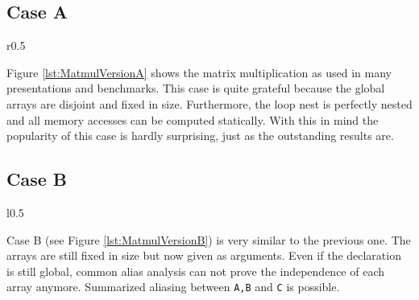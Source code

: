 

\clearpage
\lstset{frame=none}
\subsection*{Case A} 
\label{CaseStudyCaseA}
\begin{wrapfigure}[]{r}{0.5\textwidth}
  \centering
    \hfill
    \hfill
    \begin{minipage}[c]{0.4\textwidth}
    \vspace*{-7mm}
    
    \end{minipage}
    \hfill
    \hfill
    \vspace*{-2mm}
    \caption{Matrix multiplication case A}
   \label{lst:MatmulVersionA}
\end{wrapfigure}

Figure \ref{lst:MatmulVersionA} shows the matrix multiplication as used in 
many presentations and benchmarks. This case is quite grateful because the
global arrays are disjoint and fixed in size. Furthermore, the loop nest is
perfectly nested and all memory accesses can be computed statically.
With this in mind the popularity of this case is hardly surprising,
just as the outstanding results are.


\subsection*{Case B} 
\begin{wrapfigure}[]{l}{0.5\textwidth}
    \begin{minipage}[c]{0.4\textwidth}
    \vspace*{-7mm}
    
    \end{minipage}
    \hfill
    \hfill
    \vspace*{-2mm}
    \caption{Matrix multiplication case B}
    \label{lst:MatmulVersionB}
    \vspace*{-8mm}
\end{wrapfigure}

Case B (see Figure \ref{lst:MatmulVersionB}) is very similar to the previous one.
The arrays are still fixed in size but now given as arguments. Even if the
declaration is still global, common alias analysis can not prove the independence
of each array anymore. Summarized aliasing between \texttt{A,B} and \texttt{C} 
is possible.  \\

